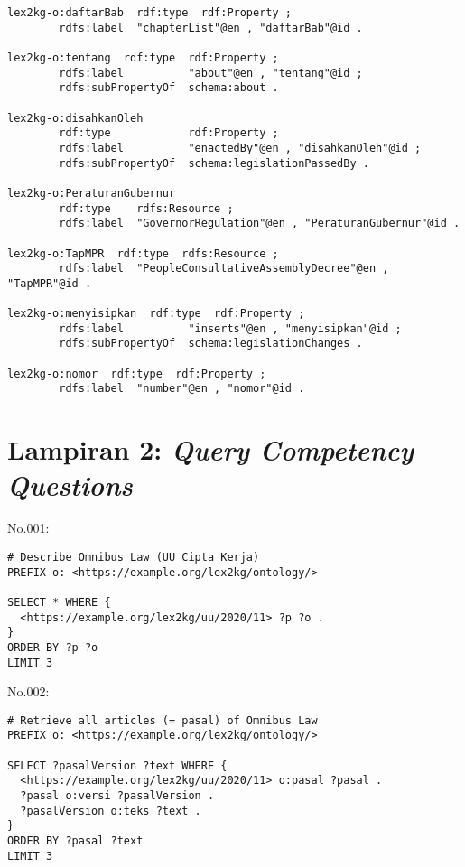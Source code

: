 \begin{lstlisting}
lex2kg-o:daftarBab  rdf:type  rdf:Property ;
        rdfs:label  "chapterList"@en , "daftarBab"@id .

lex2kg-o:tentang  rdf:type  rdf:Property ;
        rdfs:label          "about"@en , "tentang"@id ;
        rdfs:subPropertyOf  schema:about .

lex2kg-o:disahkanOleh
        rdf:type            rdf:Property ;
        rdfs:label          "enactedBy"@en , "disahkanOleh"@id ;
        rdfs:subPropertyOf  schema:legislationPassedBy .

lex2kg-o:PeraturanGubernur
        rdf:type    rdfs:Resource ;
        rdfs:label  "GovernorRegulation"@en , "PeraturanGubernur"@id .

lex2kg-o:TapMPR  rdf:type  rdfs:Resource ;
        rdfs:label  "PeopleConsultativeAssemblyDecree"@en , "TapMPR"@id .

lex2kg-o:menyisipkan  rdf:type  rdf:Property ;
        rdfs:label          "inserts"@en , "menyisipkan"@id ;
        rdfs:subPropertyOf  schema:legislationChanges .

lex2kg-o:nomor  rdf:type  rdf:Property ;
        rdfs:label  "number"@en , "nomor"@id .  
\end{lstlisting}

\chapter*{Lampiran 2: \textit{Query Competency Questions}}
\label{appendix:query}

\noindent No.001:
\begin{lstlisting}
# Describe Omnibus Law (UU Cipta Kerja)
PREFIX o: <https://example.org/lex2kg/ontology/>

SELECT * WHERE {
  <https://example.org/lex2kg/uu/2020/11> ?p ?o .
} 
ORDER BY ?p ?o
LIMIT 3
\end{lstlisting}


\noindent No.002:
\begin{lstlisting}
# Retrieve all articles (= pasal) of Omnibus Law
PREFIX o: <https://example.org/lex2kg/ontology/>

SELECT ?pasalVersion ?text WHERE {
  <https://example.org/lex2kg/uu/2020/11> o:pasal ?pasal .
  ?pasal o:versi ?pasalVersion .
  ?pasalVersion o:teks ?text .
} 
ORDER BY ?pasal ?text
LIMIT 3
\end{lstlisting}


